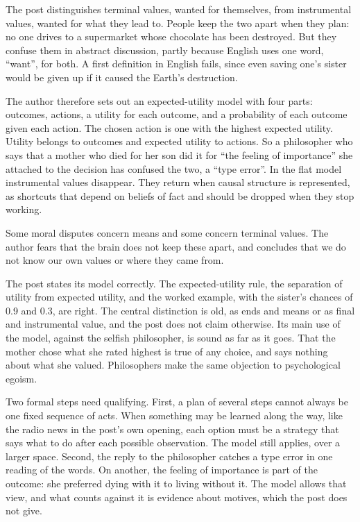 \begin{afterword}
\summaryhead

The post distinguishes terminal values, wanted for themselves, from instrumental values, wanted for what they lead to. People keep the two apart when they plan: no one drives to a supermarket whose chocolate has been destroyed. But they confuse them in abstract discussion, partly because English uses one word, ``want'', for both. A first definition in English fails, since even saving one's sister would be given up if it caused the Earth's destruction.

The author therefore sets out an expected-utility model with four parts: outcomes, actions, a utility for each outcome, and a probability of each outcome given each action. The chosen action is one with the highest expected utility. Utility belongs to outcomes and expected utility to actions. So a philosopher who says that a mother who died for her son did it for ``the feeling of importance'' she attached to the decision has confused the two, a ``type error''. In the flat model instrumental values disappear. They return when causal structure is represented, as shortcuts that depend on beliefs of fact and should be dropped when they stop working.

Some moral disputes concern means and some concern terminal values. The author fears that the brain does not keep these apart, and concludes that we do not know our own values or where they came from.

\responsehead

The post states its model correctly. The expected-utility rule, the separation of utility from expected utility, and the worked example, with the sister's chances of 0.9 and 0.3, are right. The central distinction is old, as ends and means or as final and instrumental value, and the post does not claim otherwise. Its main use of the model, against the selfish philosopher, is sound as far as it goes. That the mother chose what she rated highest is true of any choice, and says nothing about what she valued. Philosophers make the same objection to psychological egoism.

Two formal steps need qualifying. First, a plan of several steps cannot always be one fixed sequence of acts. When something may be learned along the way, like the radio news in the post's own opening, each option must be a strategy that says what to do after each possible observation. The model still applies, over a larger space. Second, the reply to the philosopher catches a type error in one reading of the words. On another, the feeling of importance is part of the outcome: she preferred dying with it to living without it. The model allows that view, and what counts against it is evidence about motives, which the post does not give.


\end{afterword}
